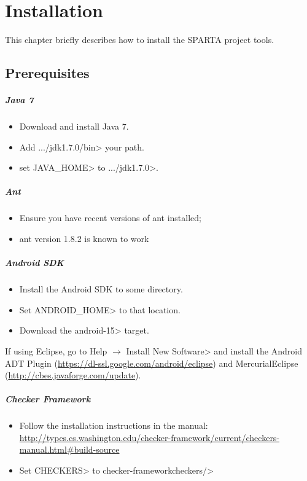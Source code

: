 \htmlhr
\chapter{Installation\label{installation}}

This chapter briefly describes how to install the SPARTA project tools.

\section {Prerequisites}
\paragraph{Java 7}
\begin{itemize}

\item Download and install Java 7.
 \item Add \<.../jdk1.7.0/bin> your path.
 \item set \<JAVA\_HOME> to  \<.../jdk1.7.0>.
\end{itemize}

\paragraph{Ant}
\begin{itemize}
\item Ensure you have recent versions of ant  installed;
 \item ant version 1.8.2 is known to work
\end{itemize}

\paragraph{Android SDK}
\begin{itemize}
 \item Install the Android SDK to some directory. 
 \item Set \<ANDROID\_HOME> to that location.
 \item Download the \<android-15> target.
\end{itemize}

If using Eclipse, go to
\<Help $\rightarrow$ Install New Software>
and install the Android ADT Plugin (\url{https://dl-ssl.google.com/android/eclipse}) and MercurialEclipse (\url{http://cbes.javaforge.com/update}).

\paragraph{Checker Framework}
\begin{itemize}
\item Follow the installation instructions in the manual: 
\url{http://types.cs.washington.edu/checker-framework/current/checkers-manual.html#build-source}
\item Set \<CHECKERS> to \<checker-framework\/checkers/>
\end{itemize}


